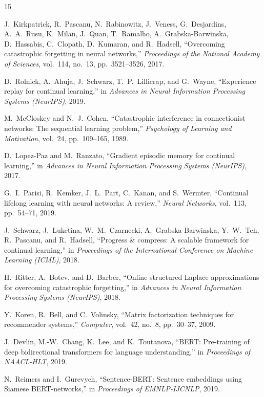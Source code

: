 \documentclass[conference]{IEEEtran}
\begin{document}
\begin{thebibliography}{15}

J.~Kirkpatrick, R.~Pascanu, N.~Rabinowitz, J.~Veness,
G.~Desjardins, A.~A.~Rusu, K.~Milan, J.~Quan, T.~Ramalho,
A.~Grabska-Barwinska, D.~Hassabis, C.~Clopath, D.~Kumaran,
and R.~Hadsell,
``Overcoming catastrophic forgetting in neural networks,''
\textit{Proceedings of the National Academy of Sciences},
vol.~114, no.~13, pp.~3521--3526, 2017.

D.~Rolnick, A.~Ahuja, J.~Schwarz, T.~P.~Lillicrap,
and G.~Wayne,
``Experience replay for continual learning,''
in \textit{Advances in Neural Information Processing Systems
(NeurIPS)}, 2019.

M.~McCloskey and N.~J.~Cohen,
``Catastrophic interference in connectionist networks:
The sequential learning problem,''
\textit{Psychology of Learning and Motivation},
vol.~24, pp.~109--165, 1989.

D.~Lopez-Paz and M.~Ranzato,
``Gradient episodic memory for continual learning,''
in \textit{Advances in Neural Information Processing Systems
(NeurIPS)}, 2017.

G.~I.~Parisi, R.~Kemker, J.~L.~Part, C.~Kanan,
and S.~Wermter,
``Continual lifelong learning with neural networks:
A review,''
\textit{Neural Networks}, vol.~113, pp.~54--71, 2019.

J.~Schwarz, J.~Luketina, W.~M.~Czarnecki, A.~Grabska-Barwinska,
Y.~W.~Teh, R.~Pascanu, and R.~Hadsell,
``Progress \& compress: A scalable framework for continual
learning,''
in \textit{Proceedings of the International Conference on
Machine Learning (ICML)}, 2018.

H.~Ritter, A.~Botev, and D.~Barber,
``Online structured Laplace approximations for overcoming
catastrophic forgetting,''
in \textit{Advances in Neural Information Processing Systems
(NeurIPS)}, 2018.

Y.~Koren, R.~Bell, and C.~Volinsky,
``Matrix factorization techniques for recommender systems,''
\textit{Computer}, vol.~42, no.~8, pp.~30--37, 2009.

J.~Devlin, M.-W.~Chang, K.~Lee, and K.~Toutanova,
``BERT: Pre-training of deep bidirectional transformers for
language understanding,''
in \textit{Proceedings of NAACL-HLT}, 2019.

N.~Reimers and I.~Gurevych,
``Sentence-BERT: Sentence embeddings using Siamese
BERT-networks,''
in \textit{Proceedings of EMNLP-IJCNLP}, 2019.


\end{thebibliography}
\end{document}

